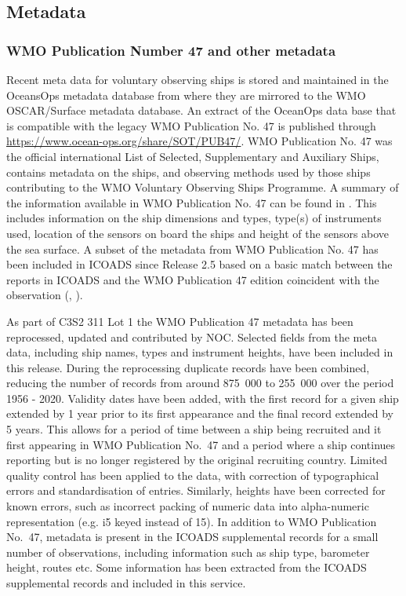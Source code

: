 \FloatBarrier
\subsection{Metadata}
\subsubsection{WMO Publication Number 47 and other metadata}
Recent meta data for voluntary observing ships is stored and maintained in the OceansOps metadata database from where they are mirrored to the WMO OSCAR/Surface metadata database.
An extract of the OceanOps data base that is compatible with the legacy WMO Publication No. 47 is published through \url{https://www.ocean-ops.org/share/SOT/PUB47/}. 
WMO Publication No. 47 was the official international List of Selected, Supplementary and Auxiliary Ships, contains metadata on the ships, and observing methods used by those ships contributing to the WMO Voluntary Observing Ships Programme. 
A summary of the information available in WMO Publication No. 47 can be found in \cite{Kent2007}. 
This includes information on the ship dimensions and types, type(s) of instruments used, location of the sensors on board the ships and height of the sensors above the sea surface.  
A subset of the metadata from WMO Publication No. 47 has been included in ICOADS since Release 2.5 based on a basic match between the reports in ICOADS and the WMO Publication 47 edition coincident with the observation (\cite{Kent2007}, \cite{Woodruff2011}).

As part of C3S2 311 Lot 1 the WMO Publication 47 metadata has been reprocessed, updated and contributed by NOC.
Selected fields from the meta data, including ship names, types and instrument heights, have been included in this release. 
During the reprocessing duplicate records have been combined, reducing the number of records from around 875~000 to 255~000 over the period 1956 - 2020. 
Validity dates have been added, with the first record for a given ship extended by 1 year prior to its first appearance and the final record extended by 5 years. 
This allows for a period of time between a ship being recruited and it first appearing in WMO Publication No.~47 and a period where a ship continues reporting but is no longer registered by the original recruiting country. 
Limited quality control has been applied to the data, with correction of typographical errors and standardisation of entries. 
Similarly, heights have been corrected for known errors, such as incorrect packing of numeric data into alpha-numeric representation (e.g. i5 keyed instead of 15). 
In addition to WMO Publication No.~47, metadata is present in the ICOADS supplemental records for a small number of observations, including information such as ship type, barometer height, routes etc. 
Some information has been extracted from the ICOADS supplemental records and included in this service.

